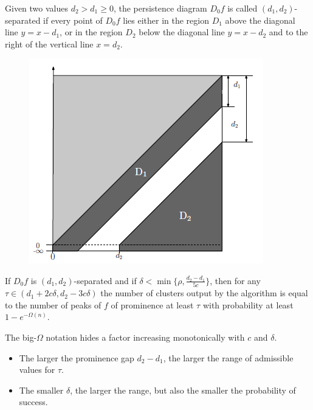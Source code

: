 \documentclass{beamer}
\theoremstyle{definition}
\begin{document}
\begin{frame}
\begin{definition}
Given two values $d_2 > d_1 \geq 0$, the persistence diagram $D_0f$ is called $(d_1, d_2)$-separated if every point of $D_0f$ lies either in the region $D_1$ above the diagonal line $y = x - d_1$, or in the region $D_2$ below the diagonal line $y = x - d_2$ and to the right
of the vertical line $x = d_2$.
\end{definition}
\begin{figure}
\centering
\includegraphics[scale=0.6]{separated}
\end{figure}
\end{frame}

\begin{frame}
\begin{theorem}
If $D_0f$ is $(d_1, d_2)$-separated and if $\delta<\min\{\rho, \frac{d_2-d_1}{5c}\}$, then for any $\tau\in (d_1 + 2c\delta, d_2 - 3c\delta)$ the number of clusters output by the algorithm is equal to the number of peaks of $f$ of prominence at least $\tau$ with probability at least $1 - e^{-\Omega(n)}$. %
\end{theorem}\pause
The big-$\Omega$ notation hides a factor increasing monotonically with $c$ and $\delta$.
\begin{itemize}
\item<3-> The larger the prominence gap $d_2- d_1$, the
larger the range of admissible values for $\tau$.
\item<4-> The smaller $\delta$, the larger the range, but also the smaller
the probability of success. %
\end{itemize}
\end{frame}
\end{document}
